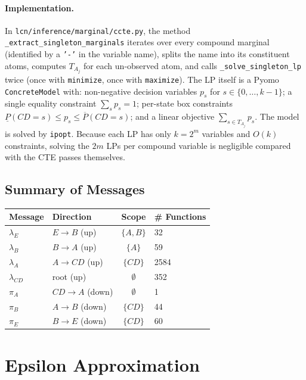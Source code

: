 \documentclass[11pt]{article}
\begin{document}
\paragraph{Implementation.}
In \texttt{lcn/inference/marginal/ccte.py}, the method
\texttt{\_extract\_singleton\_marginals} iterates over every compound marginal
(identified by a \texttt{'-'} in the variable name), splits the name into its
constituent atoms, computes $T_{A_j}$ for each un-observed atom, and calls
\texttt{\_solve\_singleton\_lp} twice (once with \texttt{minimize}, once with
\texttt{maximize}). The LP itself is a Pyomo \texttt{ConcreteModel} with:
non-negative decision variables $p_s$ for $s \in \{0, \ldots, k-1\}$; a single
equality constraint $\sum_s p_s = 1$; per-state box constraints
$\underline{P}(CD{=}s) \le p_s \le \overline{P}(CD{=}s)$; and a linear
objective $\sum_{s \in T_{A_j}} p_s$. The model is solved by \texttt{ipopt}.
Because each LP has only $k = 2^m$ variables and $O(k)$ constraints, solving
the $2m$ LPs per compound variable is negligible compared with the CTE passes
themselves.

\subsection{Summary of Messages}

\begin{center}
\begin{tabular}{llcl}
\toprule
\textbf{Message} & \textbf{Direction} & \textbf{Scope} & \textbf{\# Functions} \\
\midrule
$\lambda_E$ & $E \to B$ (up) & $\{A, B\}$ & 32 \\
$\lambda_B$ & $B \to A$ (up) & $\{A\}$ & 59 \\
$\lambda_A$ & $A \to CD$ (up) & $\{CD\}$ & 2584 \\
$\lambda_{CD}$ & root (up) & $\emptyset$ & 352 \\
\midrule
$\pi_A$ & $CD \to A$ (down) & $\emptyset$ & 1 \\
$\pi_B$ & $A \to B$ (down) & $\{CD\}$ & 44 \\
$\pi_E$ & $B \to E$ (down) & $\{CD\}$ & 60 \\
\bottomrule
\end{tabular}
\end{center}

\section{Epsilon Approximation}
\end{document}
